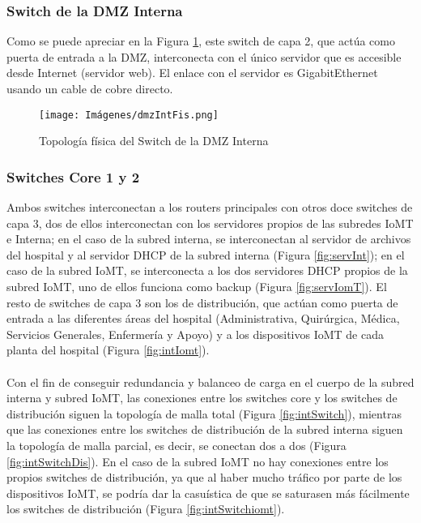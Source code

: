 \subsubsection{Switch de la DMZ Interna}
Como se puede apreciar en la Figura \ref{fig:dmzIntFis}, este switch de capa 2, que actúa como puerta de entrada a la DMZ, interconecta con el único servidor que es accesible desde Internet (servidor web). El enlace 
con el servidor es GigabitEthernet usando un cable de cobre directo.
\begin{figure}[H]
    \centering
    \texttt{[image: Imágenes/dmzIntFis.png]}
    \caption{Topología física del Switch de la DMZ Interna}
    \label{fig:dmzIntFis} 
\end{figure}

\subsubsection{Switches Core 1 y 2}
Ambos switches interconectan a los routers principales con otros doce switches de capa 3, dos de ellos interconectan con los servidores propios de las subredes IoMT e Interna; en el caso 
de la subred interna, se interconectan al servidor de archivos del hospital y al servidor DHCP de la subred interna (Figura \ref{fig:servInt}); en el caso de la subred IoMT, se interconecta a los dos servidores DHCP propios de la subred IoMT, uno de ellos funciona como backup (Figura \ref{fig:servIomT}).
El resto de switches de capa 3 son los de distribución, que actúan como puerta de entrada a las diferentes áreas del hospital (Administrativa, Quirúrgica, Médica, Servicios Generales, Enfermería y Apoyo) y a los dispositivos IoMT de cada planta del hospital (Figura \ref{fig:intIomt}).
\\ \\
Con el fin de conseguir redundancia y balanceo de carga en el cuerpo de la subred interna y subred IoMT, las conexiones entre los switches core y los switches de distribución 
siguen la topología de malla total (Figura \ref{fig:intSwitch}), mientras que las conexiones entre los switches de distribución de la subred interna siguen la topología de malla parcial, es decir, 
se conectan dos a dos (Figura \ref{fig:intSwitchDis}). En el caso de la subred IoMT no hay conexiones entre los propios switches de distribución, ya que al haber mucho tráfico por parte de los dispositivos IoMT, se podría dar la casuística de que se saturasen más fácilmente los switches de distribución (Figura \ref{fig:intSwitchiomt}).
\\ \\
